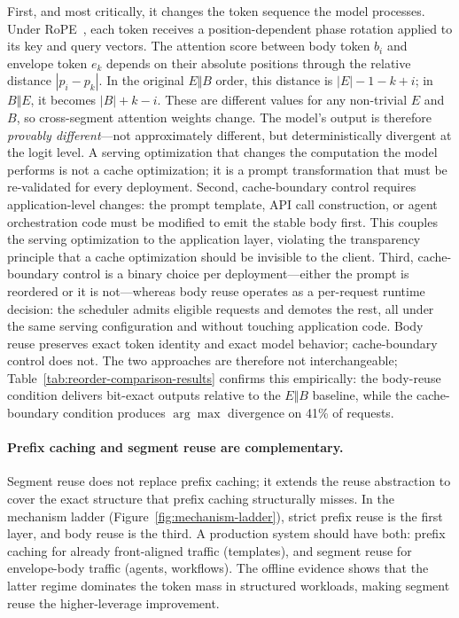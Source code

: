 \documentclass[conference]{IEEEtran}
\begin{document}
First, and most critically, it changes the token sequence the model processes. Under RoPE~\cite{su2021roformer}, each token receives a position-dependent phase rotation applied to its key and query vectors. The attention score between body token $b_i$ and envelope token $e_k$ depends on their absolute positions through the relative distance $|p_i - p_k|$. In the original $E \Vert B$ order, this distance is $|E| - 1 - k + i$; in $B \Vert E$, it becomes $|B| + k - i$. These are different values for any non-trivial $E$ and $B$, so cross-segment attention weights change. The model's output is therefore \emph{provably different}---not approximately different, but deterministically divergent at the logit level. A serving optimization that changes the computation the model performs is not a cache optimization; it is a prompt transformation that must be re-validated for every deployment. Second, cache-boundary control requires application-level changes: the prompt template, API call construction, or agent orchestration code must be modified to emit the stable body first. This couples the serving optimization to the application layer, violating the transparency principle that a cache optimization should be invisible to the client. Third, cache-boundary control is a binary choice per deployment---either the prompt is reordered or it is not---whereas body reuse operates as a per-request runtime decision: the scheduler admits eligible requests and demotes the rest, all under the same serving configuration and without touching application code. Body reuse preserves exact token identity and exact model behavior; cache-boundary control does not. The two approaches are therefore not interchangeable; Table~\ref{tab:reorder-comparison-results} confirms this empirically: the body-reuse condition delivers bit-exact outputs relative to the $E \Vert B$ baseline, while the cache-boundary condition produces $\arg\max$ divergence on 41\% of requests.

\paragraph{Prefix caching and segment reuse are complementary.}
Segment reuse does not replace prefix caching; it extends the reuse abstraction to cover the exact structure that prefix caching structurally misses. In the mechanism ladder (Figure~\ref{fig:mechanism-ladder}), strict prefix reuse is the first layer, and body reuse is the third. A production system should have both: prefix caching for already front-aligned traffic (templates), and segment reuse for envelope-body traffic (agents, workflows). The offline evidence shows that the latter regime dominates the token mass in structured workloads, making segment reuse the higher-leverage improvement.
\end{document}
